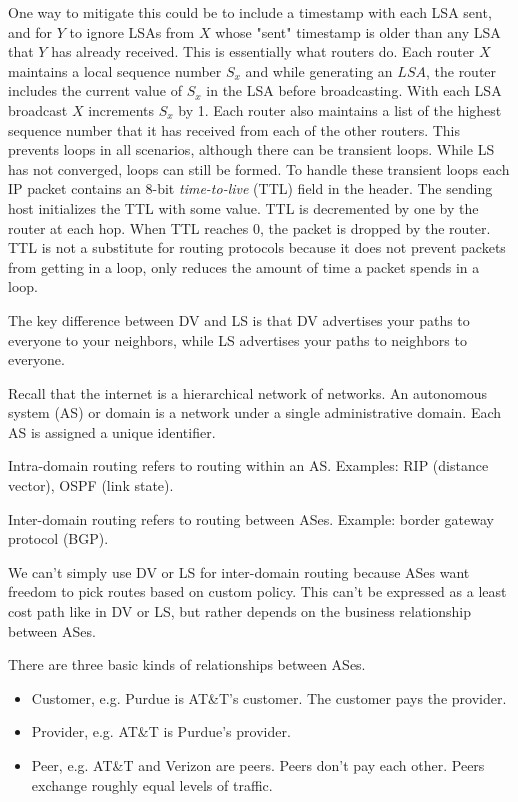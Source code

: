 One way to mitigate this could be to include a timestamp with each LSA
sent, and for $Y$ to ignore LSAs from $X$ whose "sent" timestamp is older than
any LSA that $Y$ has already received. This is essentially what routers do.
Each router $X$ maintains a local sequence number $S_x$ and while generating
an $LSA$, the router includes the current value of $S_x$ in the LSA before
broadcasting. With each LSA broadcast $X$ increments $S_x$ by 1. Each
router also maintains a list of the highest sequence number that it has
received from each of the other routers. This prevents loops in all scenarios,
although there can be transient loops. While LS has not converged, loops
can still be formed. To handle these transient loops each IP packet contains
an 8-bit \emph{time-to-live} (TTL) field in the header. The sending host
initializes the TTL with some value. TTL is decremented by one by the
router at each hop. When TTL reaches 0, the packet is dropped by the
router. TTL is not a substitute for routing protocols because it does not
prevent packets from getting in a loop, only reduces the amount of time
a packet spends in a loop.

The key difference between DV and LS is that DV advertises your paths to
everyone to your neighbors, while LS advertises your paths to neighbors
to everyone.

Recall that the internet is a hierarchical network of networks.
An autonomous system (AS) or domain is a network under a single
administrative domain. Each AS is assigned a unique identifier.

Intra-domain routing refers to routing within an AS. Examples:
RIP (distance vector), OSPF (link state).

Inter-domain routing refers to routing between ASes. Example: border gateway
protocol (BGP).

We can't simply use DV or LS for inter-domain routing because ASes want freedom
to pick routes based on custom policy. This can't be expressed as a least cost path
like in DV or LS, but rather depends on the business relationship between
ASes.

There are three basic kinds of relationships between ASes.

\begin{itemize}
    \item Customer, e.g. Purdue is AT\&T's customer. The customer pays the provider.
    \item Provider, e.g. AT\&T is Purdue's provider.
    \item Peer, e.g. AT\&T and Verizon are peers. Peers don't pay each other.
          Peers exchange roughly equal levels of traffic.
\end{itemize}

